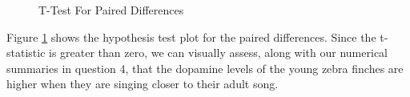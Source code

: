\documentclass{article}\usepackage[]{graphicx}\usepackage[]{xcolor}
\newenvironment{knitrout}{}{} %
\begin{document}
\begin{enumerate}
\begin{enumerate}
\begin{figure}[H]
\begin{center}
\begin{knitrout}
{}


\end{knitrout}
\caption{T-Test For Paired Differences}
\label{plot4} 
\end{center}
\end{figure}

Figure \ref{plot4} shows the hypothesis test plot for the paired differences. Since the t-statistic is greater than zero, we can visually assess, along with our numerical summaries in question 4, that the dopamine levels of the young zebra finches are higher when they are singing closer to their adult song. 


\end{enumerate}
\end{enumerate}



\end{document}
